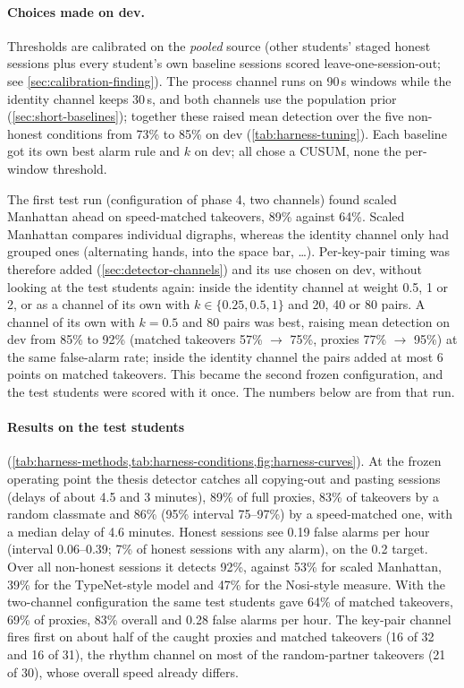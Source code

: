 \paragraph{Choices made on dev.} Thresholds are calibrated on the
\emph{pooled} source (other students' staged honest sessions plus every
student's own baseline sessions scored leave-one-session-out; see
\cref{sec:calibration-finding}). The process channel runs on 90\,s windows
while the identity channel keeps 30\,s, and both channels use the population
prior (\cref{sec:short-baselines}); together these raised mean detection over
the five non-honest conditions from 73\% to 85\% on dev
(\cref{tab:harness-tuning}). Each baseline got its own best alarm rule and $k$
on dev; all chose a CUSUM, none the per-window threshold.

The first test run (configuration of phase 4, two channels) found scaled
Manhattan ahead on speed-matched takeovers, 89\% against 64\%. Scaled
Manhattan compares individual digraphs, whereas the identity channel only had
grouped ones (alternating hands, into the space bar, \dots). Per-key-pair
timing was therefore added (\cref{sec:detector-channels}) and its use chosen on
dev, without looking at the test students again: inside the identity
channel at weight 0.5, 1 or 2, or as a channel of its own with $k\in\{0.25,
0.5, 1\}$ and 20, 40 or 80 pairs. A channel of its own with $k=0.5$ and 80
pairs was best, raising mean detection on dev from 85\% to 92\% (matched
takeovers 57\% $\to$ 75\%, proxies 77\% $\to$ 95\%) at the same false-alarm
rate; inside the identity channel the pairs added at most 6 points on matched
takeovers. This became the second frozen configuration, and the test
students were scored with it once. The numbers below are from that run.

\paragraph{Results on the test students} (\cref{tab:harness-methods,tab:harness-conditions,fig:harness-curves}).
At the frozen operating point the thesis detector catches all copying-out and
pasting sessions (delays of about 4.5 and 3 minutes), 89\% of full proxies,
83\% of takeovers by a random classmate and 86\% (95\% interval 75--97\%) by a
speed-matched one, with a median delay of 4.6 minutes. Honest sessions see
0.19 false alarms per hour (interval 0.06--0.39; 7\% of honest sessions with
any alarm), on the 0.2 target. Over all non-honest sessions it detects 92\%,
against 53\% for scaled Manhattan, 39\% for the TypeNet-style model and 47\%
for the Nosi-style measure. With the two-channel configuration the same test
students gave 64\% of matched takeovers, 69\% of proxies, 83\% overall and
0.28 false alarms per hour. The key-pair channel fires first on about half of
the caught proxies and matched takeovers (16 of 32 and 16 of 31), the
rhythm channel on most of the random-partner takeovers (21 of 30), whose
overall speed already differs.

